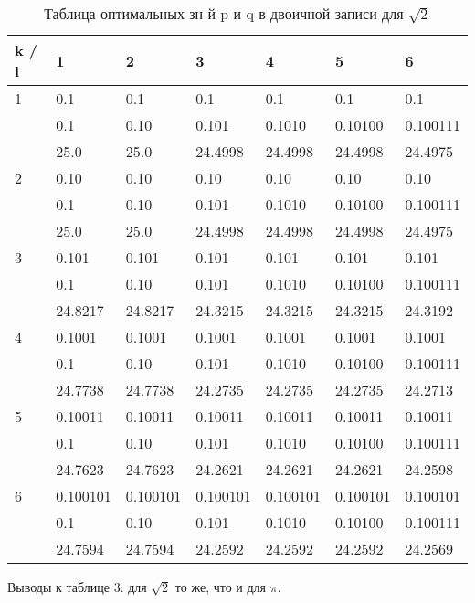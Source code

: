\documentclass[12pt]{article}
\begin{document}
		\begin{table}[!h]
		\caption{Таблица оптимальных зн-й p и q в двоичной записи для $\sqrt{2}$}
		\label{sometable}
		\begin{center}
			\begin{tabular}{|l|l|l|l|l|l|l|}
				\hline
				k / l &1 & 2 & 3 & 4 & 5 & 6\\
				\hline
				1 & 0.1& 0.1& 0.1& 0.1& 0.1& 0.1\\
				& 0.1& 0.10& 0.101& 0.1010& 0.10100& 0.100111\\
				& 25.0& 25.0& 24.4998& 24.4998& 24.4998& 24.4975\\
				\hline
				2 & 0.10& 0.10& 0.10& 0.10& 0.10& 0.10\\
				& 0.1& 0.10& 0.101& 0.1010& 0.10100& 0.100111\\
				& 25.0& 25.0& 24.4998& 24.4998& 24.4998& 24.4975\\
				\hline
				3 & 0.101& 0.101& 0.101& 0.101& 0.101& 0.101\\
				& 0.1& 0.10& 0.101& 0.1010& 0.10100& 0.100111\\
				& 24.8217& 24.8217& 24.3215& 24.3215& 24.3215& 24.3192\\
				\hline
				4 & 0.1001& 0.1001& 0.1001& 0.1001& 0.1001& 0.1001\\
				& 0.1& 0.10& 0.101& 0.1010& 0.10100& 0.100111\\
				& 24.7738& 24.7738& 24.2735& 24.2735& 24.2735& 24.2713\\
				\hline
				5 & 0.10011& 0.10011& 0.10011& 0.10011& 0.10011& 0.10011\\
				& 0.1& 0.10& 0.101& 0.1010& 0.10100& 0.100111\\
				& 24.7623& 24.7623& 24.2621& 24.2621& 24.2621& 24.2598\\
				\hline
				6 & 0.100101& 0.100101& 0.100101& 0.100101& 0.100101& 0.100101\\
				& 0.1& 0.10& 0.101& 0.1010& 0.10100& 0.100111\\
				& 24.7594& 24.7594& 24.2592& 24.2592& 24.2592& 24.2569\\
				\hline
			\end{tabular}
		\end{center}
	\end{table}
	
	Выводы к таблице 3: для $\sqrt{2}$ то же, что и для $\pi$.
	
\end{document}
